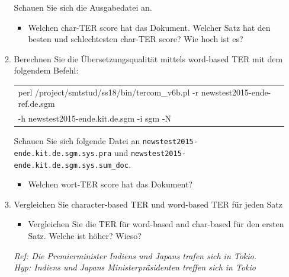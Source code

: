 \documentclass[12pt,fleqn]{article}
\begin{document}
\begin{enumerate}
\begin{enumerate}
\vspace{0.5cm} 
Schauen Sie sich die Ausgabedatei an. 

\vspace{0.5cm} 
\begin{itemize} 
\item Welchen char-TER score hat das Dokument. Welcher Satz hat den besten und schlechtesten char-TER score? Wie hoch ist es? %
\end{itemize} 


\vspace{0.5cm} 
\item Berechnen Sie die Übersetzungsqualität mittels word-based TER mit dem folgendem Befehl:

\vspace{0.5cm} 
\begin{table}[h] 
 \begin{center} 
\begin{tabular}{l} 
perl /project/smtstud/ss18/bin/tercom\_v6b.pl -r newstest2015-ende-ref.de.sgm\\
-h newstest2015-ende.kit.de.sgm -i sgm -N \\ 
\end{tabular}
 \end{center}
\end{table}

\vspace{0.5cm} 
Schauen Sie sich folgende Datei an \texttt{newstest2015-ende.kit.de.sgm.sys.pra} und \texttt{newstest2015-ende.kit.de.sgm.sys.sum\_doc}.
\vspace{0.5cm} 
\begin{itemize} 
\item Welchen wort-TER score hat das Dokument? %
\end{itemize} 

\vspace{0.5cm} 
\item Vergleichen Sie character-based TER und word-based TER für jeden Satz

\vspace{0.5cm} 
\begin{itemize} 
 \item Vergleichen Sie die TER für word-based and char-based für den ersten Satz. Welche ist höher? Wieso? 
\end{itemize}

\vspace{0.5cm} 
\textit{Ref: Die Premierminister Indiens und Japans trafen sich in Tokio. } \\ 
\textit{Hyp: Indiens und Japans Ministerpräsidenten treffen sich in Tokio } \\ 


\end{enumerate}
\end{enumerate}
\end{document}
